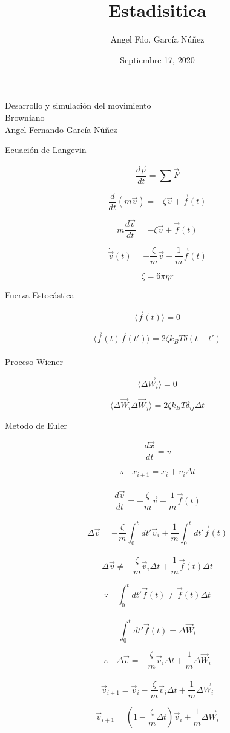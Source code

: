 \documentclass[10pt,a4papper]{article}
\author{Angel Fdo. García Núñez}
\date{Septiembre 17, 2020}
\title{Estadisitica}
\begin{document}
\Huge
Desarrollo y simulación del movimiento\\
Browniano\\

Angel Fernando García Núñez

\Large
\newpage
Ecuación de Langevin

\[\frac{d\vec p}{dt}=\sum\vec F\]

\[\frac{d}{dt}(m\vec v)=-\zeta\vec v+\vec f(t)\]

\[m\frac{d\vec v}{dt}=-\zeta\vec v+\vec f(t)\]

\[\dot{\vec v}(t)=-\frac{\zeta}{m}\vec v+\frac{1}{m}\vec f(t)\]

\[\zeta=6\pi\eta r\]

\newpage
Fuerza Estocástica

\[\langle\vec f(t)\rangle=0\]

\[\langle\vec f(t)\vec f(t')\rangle=2\zeta k_BT\delta(t-t')\]\\

Proceso Wiener

\[\langle\Delta\vec W_i\rangle=0\]

\[\langle\Delta\vec W_i\Delta\vec W_j\rangle=2\zeta k_BT\delta_{ij}\Delta t\]

\newpage
Metodo de Euler

\[\frac{d\vec x}{dt}=v\]

\[\boxed{\therefore\quad x_{i+1}=x_i+v_i\Delta t}\]\\

\[\frac{d\vec v}{dt}=-\frac{\zeta}{m}\vec v+\frac{1}{m}\vec f(t)\]\\

\[\Delta\vec v=-\frac{\zeta}{m}\int_0^tdt'\vec v_i+\frac{1}{m}\int_0^tdt'\vec f(t)\]\\

\[\Delta\vec v\not=-\frac{\zeta}{m}\vec v_i\Delta t+\frac{1}{m}\vec f(t)\Delta t\]

\[\because\quad\int_0^tdt'\vec f(t)\not=\vec f(t)\Delta t\]\\

\[\int_0^tdt'\vec f(t)=\Delta\vec W_i\]

\[\therefore\quad\Delta\vec v=-\frac{\zeta}{m}\vec v_i\Delta t+\frac{1}{m}\Delta\vec W_i\]\\

\[\vec v_{i+1}=\vec v_i-\frac{\zeta}{m}\vec v_i\Delta t+\frac{1}{m}\Delta\vec W_i\]

\[\vec v_{i+1}=\left(1-\frac{\zeta}{m}\Delta t\right)\vec v_i+\frac{1}{m}\Delta\vec W_i\]
\end{document}
